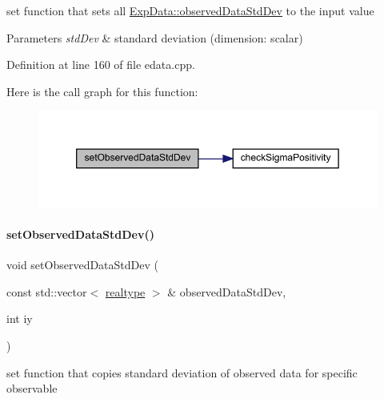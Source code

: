 set function that sets all \mbox{\hyperlink{classamici_1_1_exp_data_aa097568cebb4be48c4c1dfaab0c2a159}{Exp\+Data\+::observed\+Data\+Std\+Dev}} to the input value


\begin{DoxyParams}{Parameters}
{\em std\+Dev} & standard deviation (dimension\+: scalar) \\
\hline
\end{DoxyParams}


Definition at line 160 of file edata.\+cpp.

Here is the call graph for this function\+:
\nopagebreak
\begin{figure}[H]
\begin{center}
\leavevmode
\includegraphics[width=350pt]{classamici_1_1_exp_data_ae6ed832b9bee1861d233c90d5a37c677_cgraph}
\end{center}
\end{figure}
\mbox{\label{classamici_1_1_exp_data_a90948c75e8ce51cd69be08a92215e6c2}} 
\paragraph{\texorpdfstring{set\+Observed\+Data\+Std\+Dev()}{setObservedDataStdDev()}\hspace{0.1cm}{\footnotesize\ttfamily [3/4]}}
{\footnotesize\ttfamily void set\+Observed\+Data\+Std\+Dev (\begin{DoxyParamCaption}\item[{const std\+::vector$<$ \mbox{\hyperlink{namespaceamici_a1bdce28051d6a53868f7ccbf5f2c14a3}{realtype}} $>$ \&}]{observed\+Data\+Std\+Dev,  }\item[{int}]{iy }\end{DoxyParamCaption})}

set function that copies standard deviation of observed data for specific observable


